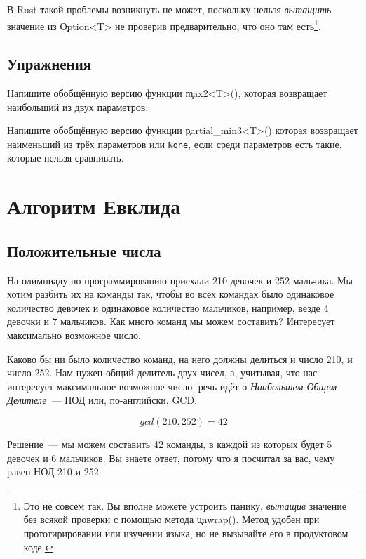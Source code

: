 В Rust такой проблемы возникнуть не может, поскольку нельзя {\em вытащить} значение из \c{Option<T>} не проверив предварительно, что оно там есть\footnote{
  Это не совсем так.
  Вы вполне можете устроить панику, {\em вытащив} значение без всякой проверки с помощью метода \c{unwrap()}.
  Метод удобен при прототирировании или изучении языка, но не вызывайте его в продуктовом коде.}.

\subsection {Упражнения}

\begin{Exercise}
  \Question
  Напишите обобщённую версию функции \c{max2<T>()}, которая возвращает наибольший из двух параметров.
\end{Exercise}
    
\begin{Exercise}
  \Question
  Напишите обобщённую версию функции \c{partial\_min3<T>()} которая возвращает наименьший из трёх параметров или \texttt{None}, если среди параметров есть такие, которые нельзя сравнивать.
\end{Exercise}

\section{Алгоритм Евклида}

\subsection{Положительные числа}

\begin{Exercise}
  \Question
  На олимпиаду по программированию приехали 210 девочек и 252 мальчика.
  Мы хотим разбить их на команды так, чтобы во всех командах было одинаковое количество девочек и одинаковое количество мальчиков, например, везде 4 девочки и 7 мальчиков.
  Как много команд мы можем составить? Интересует максимально возможное число.
\end{Exercise}

Каково бы ни было количество команд, на него должны делиться и число 210, и число 252.
Нам нужен общий делитель двух чисел, а, учитывая, что нас интересует максимальное возможное число, речь идёт о {\em Наибольшем Общем Делителе}~--- НОД или, по-английски, GCD.

$$
gcd(210, 252) = 42
$$

Решение~--- мы можем составить 42 команды, в каждой из которых будет 5 девочек и 6 мальчиков.
Вы знаете ответ, потому что я посчитал за вас, чему равен НОД 210 и 252.

